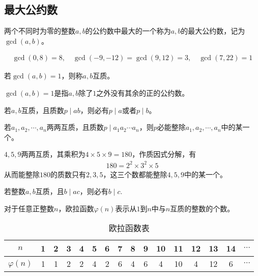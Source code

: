 \subsection{最大公约数}
\label{sec:gcd}

\begin{definition}
  两个不同时为零的整数$a,b$的公约数中最大的一个称为$a,b$的最大公约数，记为$\gcd(a,b)$。
\end{definition}

\begin{example}
  \begin{align*}
    \gcd(0,8)=8,\quad 
    \gcd(-9,-12)=\gcd(9,12)=3,\quad
    \gcd(7,22)=1
  \end{align*}
\end{example}

\begin{definition}[互质，Coprime]
  若$\gcd(a,b)=1$，则称$a,b$互质。
\end{definition}
$\gcd(a,b)=1$是指$a,b$除了$1$之外没有其余的正的公约数。

\begin{theorem}
  若$a,b$互质，且质数$p\mid ab$，则必有$p\mid a$或者$p\mid b$。
\end{theorem}
\begin{corollary}
  若$a_1,a_2,\cdots,a_n$两两互质，且质数$p\mid a_1a_2\cdots a_n$，则$p$必能整除$a_1,a_2,\cdots, a_n$中的某一个。
\end{corollary}

\begin{example}
  $4,5,9$两两互质，其乘积为$4\times5\times9=180$，作质因式分解，有
  \begin{align*}
    180=2^2\times 3^2\times 5
  \end{align*}
  从而能整除$180$的质数只有$2,3,5$，这三个数都能整除$4,5,9$中的某一个。
\end{example}

\begin{theorem}
  若整数$a,b$互质，且$b\mid ac$，则必有$b\mid c.$
\end{theorem}

\begin{definition}\label{def:Euler-function}
  对于任意正整数$n$，欧拉函数$\varphi(n)$表示从$1$到$n$中与$n$互质的整数的个数。
\end{definition}

\begin{table}[htbp]
  \centering
  \caption{欧拉函数表}
  \label{tab:Euler-function-values}
  \begin{tabular}{cccccccccccccccc}
    \toprule
    $n$          & 1 & 2 & 3 & 4 & 5 & 6 & 7 & 8 & 9 & 10 & 11 & 12 & 13 & 14 & $\cdots$\\\midrule
    $\varphi(n)$ & 1 & 1 & 2 & 2 & 4 & 2 & 6 & 4 & 6 & 4  & 10 & 4  & 12 & 6  & $\cdots$\\
    \bottomrule
  \end{tabular}
\end{table}

